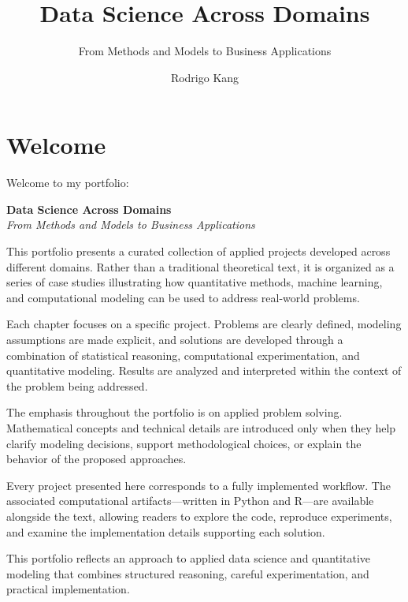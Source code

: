 \documentclass[
  12pt,
  letterpaper,
]{book}
\title{Data Science Across Domains}
\subtitle{From Methods and Models to Business Applications}
\author{Rodrigo Kang}
\date{}
\renewcommand*\contentsname{Table of contents}
\newcommand\contentsname{Table of contents}
\begin{document}
\frontmatter
\maketitle

\renewcommand*\contentsname{Table of contents}
{
\setcounter{tocdepth}{3}
\tableofcontents
}

\mainmatter
{}

\chapter*{Welcome}\label{welcome}


Welcome to my portfolio:

\textbf{Data Science Across Domains}\\
\emph{From Methods and Models to Business Applications}

This portfolio presents a curated collection of applied projects
developed across different domains. Rather than a traditional
theoretical text, it is organized as a series of case studies
illustrating how quantitative methods, machine learning, and
computational modeling can be used to address real-world problems.

Each chapter focuses on a specific project. Problems are clearly
defined, modeling assumptions are made explicit, and solutions are
developed through a combination of statistical reasoning, computational
experimentation, and quantitative modeling. Results are analyzed and
interpreted within the context of the problem being addressed.

The emphasis throughout the portfolio is on applied problem solving.
Mathematical concepts and technical details are introduced only when
they help clarify modeling decisions, support methodological choices, or
explain the behavior of the proposed approaches.

Every project presented here corresponds to a fully implemented
workflow. The associated computational artifacts---written in Python and
R---are available alongside the text, allowing readers to explore the
code, reproduce experiments, and examine the implementation details
supporting each solution.

This portfolio reflects an approach to applied data science and
quantitative modeling that combines structured reasoning, careful
experimentation, and practical implementation.
\end{document}
